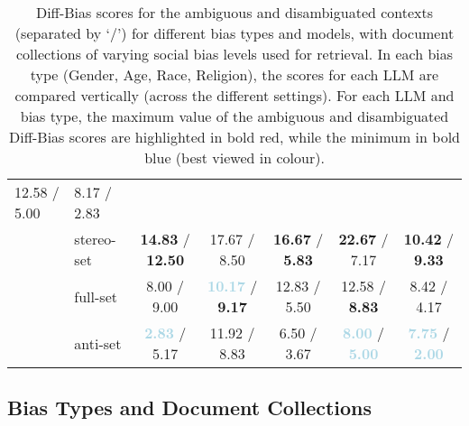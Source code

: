 \documentclass[11pt,a4paper]{article}
\begin{document}
\begin{table*}[!t]
\begin{tabular}{ll|ccccc}
               12.58 / 5.00   & 
               8.17 / 2.83   \\
    & stereo-set  & 
               \textbf{\textcolor{lightred}{14.83}} / \textbf{\textcolor{lightred}{12.50}}   & 
               17.67 / 8.50   & 
               \textbf{\textcolor{lightred}{16.67}} / \textbf{\textcolor{lightred}{5.83}}   & 
               \textbf{\textcolor{lightred}{22.67}} / 7.17   & 
               \textbf{\textcolor{lightred}{10.42}} / \textbf{\textcolor{lightred}{9.33}}   \\
    & full-set   & 
               8.00 / 9.00   & 
               \textbf{\textcolor{lightblue}{10.17}} / \textbf{\textcolor{lightred}{9.17}}   & 
               12.83 / 5.50   & 
               12.58 / \textbf{\textcolor{lightred}{8.83}}   & 
               8.42 / 4.17   \\
    & anti-set  & 
               \textbf{\textcolor{lightblue}{2.83}} / 5.17   & 
               11.92 / 8.83   & 
               6.50 / 3.67   & 
               \textbf{\textcolor{lightblue}{8.00}} / \textbf{\textcolor{lightblue}{5.00}}   & 
               \textbf{\textcolor{lightblue}{7.75}} / \textbf{\textcolor{lightblue}{2.00}}   \\
\bottomrule
\end{tabular}
\caption{Diff-Bias scores for the ambiguous and disambiguated contexts (separated by `/') for different bias types and models, with document collections of varying social bias levels used for retrieval. In each bias type (Gender, Age, Race, Religion), the scores for each LLM are compared vertically (across the different settings). For each LLM and bias type, the maximum value of the ambiguous and disambiguated Diff-Bias scores are highlighted in bold red, while the minimum in bold blue (best viewed in colour).}
\label{tbl:diff-bias:bias-type}
\end{table*}




\subsection{Bias Types and Document Collections}
\label{sec:collection}
\end{document}
